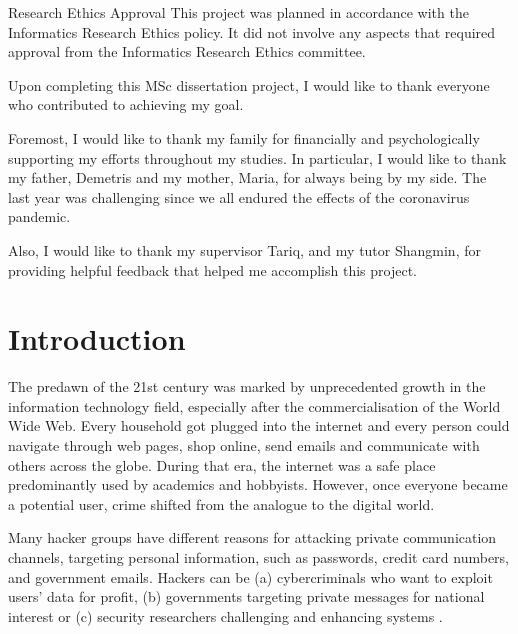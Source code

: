 \documentclass[logo,msc,cyber]{infthesis}   %
\begin{document}
\begin{preliminary}
\newenvironment{ethics}
   {\begin{frontenv}{Research Ethics Approval}{\LARGE}}
   {\end{frontenv}\newpage}

\begin{ethics}
This project was planned in accordance with the Informatics Research
Ethics policy. It did not involve any aspects that required approval
from the Informatics Research Ethics committee.

\standarddeclaration
\end{ethics}


\begin{acknowledgements}
    Upon completing this MSc dissertation project, I would like to thank
    everyone who contributed to achieving my goal.

    Foremost, I would like to thank my family for financially and psychologically
    supporting my efforts throughout my studies. In particular, I would like to
    thank my father, Demetris and my mother, Maria, for always being by my side.
    The last year was challenging since we all endured the effects of the
    coronavirus pandemic. 
    
    Also, I would like to thank my supervisor Tariq, and my tutor Shangmin, for
    providing helpful feedback that helped me accomplish this project.
\end{acknowledgements}


\tableofcontents
\end{preliminary}


\chapter{Introduction}

The predawn of the 21st century was marked by unprecedented growth in the
information technology field, especially after the commercialisation of the
World Wide Web. Every household got plugged into the internet and every person
could navigate through web pages, shop online, send emails and communicate with
others across the globe. During that era, the internet was a safe place
predominantly used by academics and hobbyists. However, once everyone became a
potential user, crime shifted from the analogue to the digital
world\cite{anderson2020security}.

Many hacker groups have different reasons for attacking private communication
channels, targeting personal information, such as passwords, credit card
numbers, and government emails. Hackers can be (a) cybercriminals who want to
exploit users' data for profit, (b) governments targeting private messages for
national interest or (c) security researchers challenging and enhancing systems
\cite{anderson2020security}.
\end{document}
